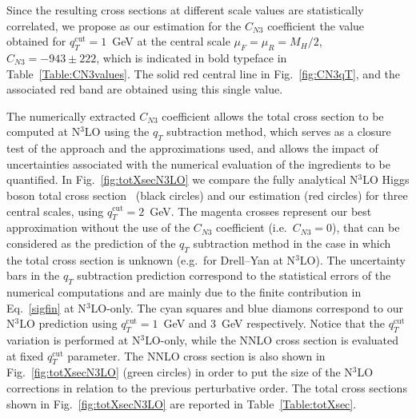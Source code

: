 \documentclass[12pt]{article}
\DeclareRobustCommand{\qt}{q_T}
\DeclareRobustCommand{\qtcut}{\ensuremath{q_T^\mathrm{cut}}}
\begin{document}
Since the resulting cross sections at different scale values are statistically correlated, we propose as our estimation for the $C_{N3}$ coefficient the value obtained for  $\qtcut=1$~GeV   at the central scale $\mu_F=\mu_R=M_{H}/2$, $C_{N3}=-943 \pm 222$, which is indicated in bold typeface in Table~\ref{Table:CN3values}.
The solid red central line in Fig.~\ref{fig:CN3qT}, and the associated red band are obtained using this single value. 



 
The numerically extracted $C_{N3}$ coefficient allows the total cross section to be computed at N$^{3}$LO using 
the $\qt$ subtraction method, which serves as a closure test of the approach and the approximations used,  and allows the impact of uncertainties associated with the numerical evaluation of the ingredients to be quantified. 
In Fig.~\ref{fig:totXsecN3LO} we compare the fully analytical N$^{3}$LO Higgs boson total cross section~\cite{Mistlberger:2018etf} (black circles) and our  estimation (red circles) for three central scales, using $\qtcut=2$~GeV. The magenta crosses represent our best approximation without the use of the $C_{N3}$ coefficient (i.e.\ $C_{N3}=0$), that can be considered as the prediction of the $\qt$ subtraction method in the case in which the total cross section is unknown (e.g.\ for Drell--Yan at N$^{3}$LO). The uncertainty bars in the $\qt$ subtraction prediction correspond to the statistical errors of the numerical computations and are mainly due to the finite contribution in Eq.~\eqref{sigfin} at N$^{3}$LO-only. The cyan squares and blue diamons correspond to our N$^{3}$LO prediction using $\qtcut=1$~GeV and 3~GeV respectively. Notice that the $\qtcut$ variation is performed at N$^{3}$LO-only, while the NNLO cross section is evaluated at fixed $\qtcut$ parameter.
The NNLO cross section is also shown in Fig.~\ref{fig:totXsecN3LO} (green circles) in order to put the size of the N$^{3}$LO corrections in relation to the previous perturbative order. The total cross sections shown in Fig.~\ref{fig:totXsecN3LO} are reported in Table~\ref{Table:totXsec}.
\end{document}
